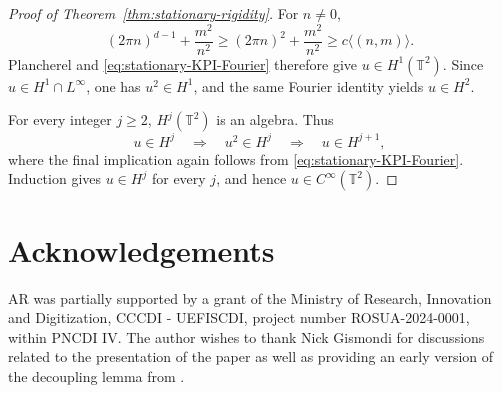\documentclass[12pt,reqno,letterpaper]{amsart}
\numberwithin{equation}{section}
\theoremstyle{definition}
\newcommand{\T}{\mathbb T}
\begin{document}
\begin{proof}[Proof of Theorem~\ref{thm:stationary-rigidity}]
For $n\neq0$,
\[
 (2\pi n)^{d-1}+\frac{m^2}{n^2}
 \geq(2\pi n)^2+\frac{m^2}{n^2}
 \geq c\langle(n,m)\rangle.
\]
Plancherel and
\eqref{eq:stationary-KPI-Fourier} therefore give $u\in H^1(\T^2)$.
Since $u\in H^1\cap L^\infty$, one has $u^2\in H^1$, and the same Fourier
identity yields $u\in H^2$.

For every integer $j\geq2$, $H^j(\T^2)$ is an algebra.  Thus
\[
 u\in H^j
 \quad\Longrightarrow\quad u^2\in H^j
 \quad\Longrightarrow\quad u\in H^{j+1},
\]
where the final implication again follows from
\eqref{eq:stationary-KPI-Fourier}.  Induction gives $u\in H^j$ for every
$j$, and hence $u\in C^\infty(\T^2)$.
\end{proof}

\section*{Acknowledgements}

AR was partially supported by a grant of the Ministry of Research,
Innovation and Digitization, CCCDI - UEFISCDI, project number
ROSUA-2024-0001, within PNCDI IV. The author wishes to thank Nick Gismondi for discussions related to the
presentation of the paper as well as providing an early version of the
decoupling lemma from \cite{KSflex}.
\end{document}
